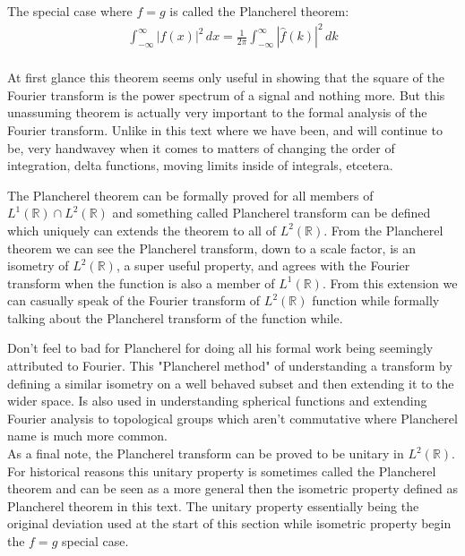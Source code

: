 \documentclass[12pt]{report}
\begin{document}
The special case where $f = g$ is called the Plancherel theorem:
\begin{equation*}
\begin{aligned}
\int_{-\infty}^{\infty}|f(x)|^2\,dx = \frac{1}{2\pi}\int_{-\infty}^{\infty}|\hat{f}(k)|^2\,dk \\
\end{aligned}
\end{equation*}

At first glance this theorem seems only useful in showing that the square of the Fourier transform is the power spectrum of a signal and nothing more.
But this unassuming theorem is actually very important to the formal analysis of the Fourier transform.
Unlike in this text where we have been, and will continue to be, very handwavey when it comes to matters of changing the order of integration, delta functions, moving limits inside of integrals, etcetera. 

The Plancherel theorem can be formally proved for all members of $L^1(\mathbb{R})\cap L^2(\mathbb{R})$ and something called Plancherel transform can be defined which uniquely can extends the theorem to all of $L^2(\mathbb{R})$.
From the Plancherel theorem we can see the Plancherel transform, down to a scale factor, is an isometry of $L^2(\mathbb{R})$, a super useful property, and agrees with the Fourier transform when the function is also a member of $L^1(\mathbb{R})$.
From this extension we can casually speak of the Fourier transform of $L^2(\mathbb{R})$ function while formally talking about the Plancherel transform of the function while.

Don't feel to bad for Plancherel for doing all his formal work being seemingly attributed to Fourier.
This "Plancherel method" of understanding a transform by defining a similar isometry on a well behaved subset and then extending it to the wider space.
Is also used in understanding spherical functions and extending Fourier analysis to topological groups which aren't commutative where Plancherel name is much more common.
\\

As a final note, the Plancherel transform can be proved to be unitary in $L^2(\mathbb{R})$.
For historical reasons this unitary property is sometimes called the Plancherel theorem and can be seen as a more general then the isometric property defined as Plancherel theorem in this text. 
The unitary property essentially being the original deviation used at the start of this section while isometric property begin the $f=g$ special case.
\end{document}
